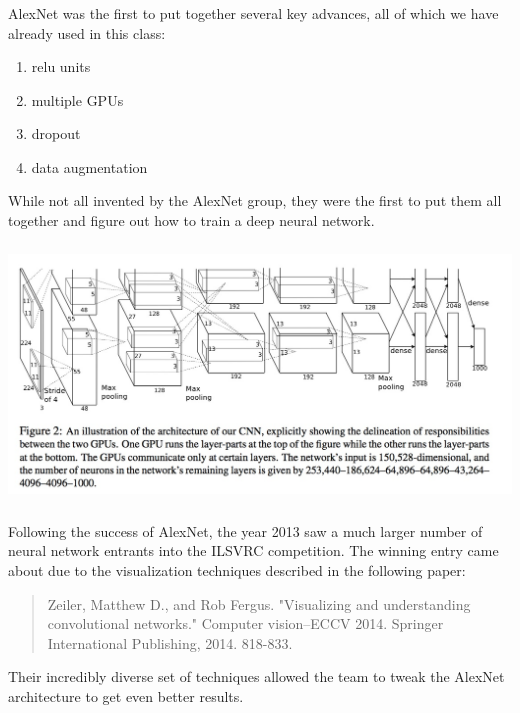 \documentclass[xetex,mathserif,serif,aspectratio=169]{beamer}
\begin{document}
\begin{frame}[fragile] \frametitle{} \oldB \small


AlexNet was the first to put together several key advances, all
of which we have already used in this class:
\begin{enumerate}
\item relu units
\item multiple GPUs
\item dropout
\item data augmentation
\end{enumerate}
While not all invented by the AlexNet group, they were the first
to put them all together and figure out how to train a deep
neural network.

\end{frame}

\begin{frame}[fragile] \frametitle{} \oldB \small

\begin{center}
\includegraphics[width=\textwidth]{img/alexNet.jpg}
\end{center}

\end{frame}

\begin{frame}[fragile] \frametitle{} \oldB \small


Following the success of AlexNet, the year 2013 saw a much
larger number of neural network entrants into the ILSVRC
competition. The winning entry came about due to the
visualization techniques described in the following paper:
\begin{quote}
Zeiler, Matthew D., and Rob Fergus. "Visualizing and understanding convolutional networks." Computer vision–ECCV 2014. Springer International Publishing, 2014. 818-833.
\end{quote}
Their incredibly diverse set of techniques allowed the team
to tweak the AlexNet architecture to get even better results.

\end{frame}
\end{document}
